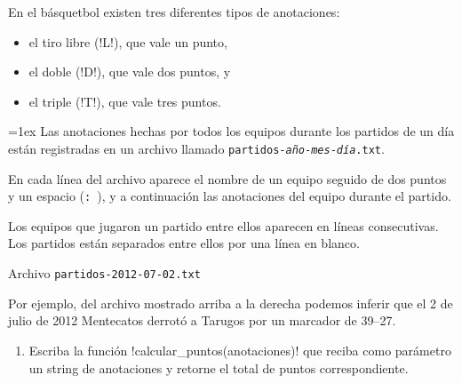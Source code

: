 En el básquetbol existen tres diferentes tipos de anotaciones:
\begin{itemize}
  \item el tiro libre (\li!L!), que vale un punto,
  \item el doble (\li!D!), que vale dos puntos, y
  \item el triple (\li!T!), que vale tres puntos.
\end{itemize}

\begin{minipage}[t]{0.52\textwidth}
  \parskip=1ex
  Las anotaciones hechas por todos los equipos
  durante los partidos de un día
  están registradas en un archivo
  llamado \texttt{partidos-\textit{año}-\textit{mes}-\textit{día}.txt}.

  En cada línea del archivo aparece el nombre de un equipo
  seguido de dos puntos y un espacio (\verb+: +),
  y a continuación las anotaciones del equipo durante el partido.

  Los equipos que jugaron un partido entre ellos
  aparecen en líneas consecutivas.
  Los partidos están separados entre ellos
  por una línea en blanco.

\end{minipage}
\hfill
\begin{minipage}[t]{0.43\textwidth}
  \centering
  Archivo \verb+partidos-2012-07-02.txt+
  \small
  
\end{minipage}

Por ejemplo,
del archivo mostrado arriba a la derecha
podemos inferir que el 2 de julio de 2012
Mentecatos derrotó a Tarugos por un marcador de 39--27.

\begin{enumerate}[leftmargin=0pt,label=\emph{\alph*})]

  \item
    Escriba la función \li!calcular_puntos(anotaciones)!
    que reciba como parámetro un string de anotaciones
    y retorne el total de puntos correspondiente.
    

\end{enumerate}
